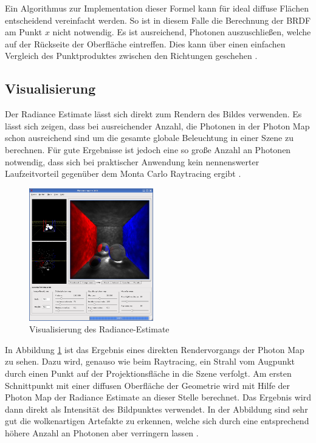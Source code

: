 \documentclass[a4paper,twocolumn,abstracton]{scrartcl}
\begin{document}
Ein Algorithmus zur Implementation dieser Formel kann für ideal diffuse Flächen entscheidend vereinfacht werden. So ist in diesem Falle die Berechnung der BRDF am Punkt $x$ nicht notwendig. Es ist ausreichend, Photonen auszuschließen, welche auf der Rückseite der Oberfläche eintreffen. Dies kann über einen einfachen Vergleich des Punktproduktes zwischen den Richtungen geschehen \citep{Jensen2001}.

\subsection{Visualisierung}
Der Radiance Estimate lässt sich direkt zum Rendern des Bildes verwenden. Es lässt sich zeigen, dass bei ausreichender Anzahl, die Photonen in der Photon Map schon ausreichend sind um die gesamte globale Beleuchtung in einer Szene zu berechnen. Für gute Ergebnisse ist jedoch eine so große Anzahl an Photonen notwendig, dass sich bei praktischer Anwendung kein nennenswerter Laufzeitvorteil gegenüber dem Monta Carlo Raytracing ergibt \citep{Jensen2001}.

\begin{figure}[htb]
\centering
\includegraphics[width=0.48\textwidth]{img/map}
\caption{Visualisierung des Radiance-Estimate}
\label{fig:map}
\end{figure}

In Abbildung \ref{fig:map} ist das Ergebnis eines direkten Rendervorgangs der Photon Map zu sehen. Dazu wird, genauso wie beim Raytracing, ein Strahl vom Augpunkt durch einen Punkt auf der Projektionsfläche in die Szene verfolgt. Am ersten Schnittpunkt mit einer diffusen Oberfläche der Geometrie wird mit Hilfe der Photon Map der Radiance Estimate an dieser Stelle berechnet. Das Ergebnis wird dann direkt als Intensität des Bildpunktes verwendet. In der Abbildung sind sehr gut die wolkenartigen Artefakte zu erkennen, welche sich durch eine entsprechend höhere Anzahl an Photonen aber verringern lassen \citep{Jensen2001}.
\end{document}
